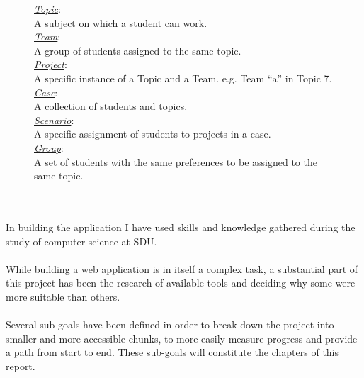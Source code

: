 \begin{figure}[b!]
	\begin{tcolorbox}[title={Terminology in regards to the assignment program},colbacktitle=gray]
		\underline{\textit{Topic}}:\\A subject on which a student can work.\\
		\underline{\textit{Team}}:\\A group of students assigned to the same topic.\\
		\underline{\textit{Project}}:\\A specific instance of a Topic and a Team. e.g. Team ``a'' in Topic 7.\\
		\underline{\textit{Case}}:\\A collection of students and topics.\\
		\underline{\textit{Scenario}}:\\A specific assignment of students to projects in a case.\\
		\underline{\textit{Group}}:\\A set of students with the same preferences to be assigned to the same topic.\\
	\end{tcolorbox}
\label{text:termin_assignment}
\end{figure}
\\\\
In building the application I have used skills and knowledge gathered during the study of computer science at SDU.
\\\\While building a web application is in itself a complex task, a substantial part of this project has been the research of available tools and deciding why some were more suitable than others.
\\\\
Several sub-goals have been defined in order to break down the project into smaller and more accessible chunks, to more easily measure progress and provide a path from start to end. These sub-goals will constitute the chapters of this report.
\\\\
